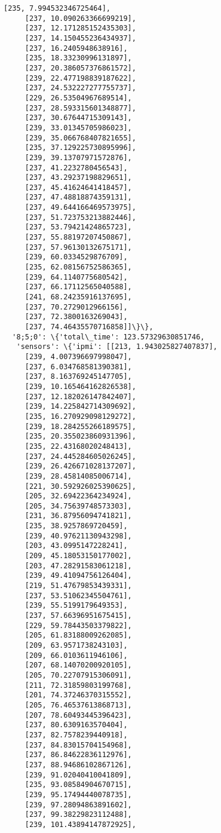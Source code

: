 \documentclass[11pt]{article}
\begin{document}
\begin{tcolorbox}[breakable, size=fbox, boxrule=.5pt, pad at break*=1mm, opacityfill=0]
\begin{Verbatim}[commandchars=\\\{\}]
     [235, 7.994532346725464],
     [237, 10.090263366699219],
     [237, 12.171285152435303],
     [237, 14.150455236434937],
     [237, 16.2405948638916],
     [235, 18.33230996131897],
     [237, 20.386057376861572],
     [239, 22.477198839187622],
     [237, 24.532227277755737],
     [229, 26.53504967689514],
     [237, 28.593315601348877],
     [237, 30.67644715309143],
     [239, 33.01345705986023],
     [239, 35.066768407821655],
     [235, 37.129225730895996],
     [239, 39.13707971572876],
     [237, 41.2232780456543],
     [237, 43.29237198829651],
     [237, 45.41624641418457],
     [237, 47.48818874359131],
     [237, 49.644166469573975],
     [237, 51.723753213882446],
     [237, 53.79421424865723],
     [237, 55.88197207450867],
     [237, 57.96130132675171],
     [239, 60.0334529876709],
     [235, 62.08156752586365],
     [239, 64.1140775680542],
     [237, 66.17112565040588],
     [241, 68.24235916137695],
     [237, 70.2729012966156],
     [237, 72.3800163269043],
     [237, 74.46435570716858]]\}\},
  '8;5;0': \{'total\_time': 123.57329630851746,
   'sensors': \{'ipmi': [[213, 1.943025827407837],
     [239, 4.007396697998047],
     [237, 6.034768581390381],
     [237, 8.163769245147705],
     [239, 10.165464162826538],
     [237, 12.182026147842407],
     [239, 14.225842714309692],
     [235, 16.270929098129272],
     [239, 18.284255266189575],
     [235, 20.355023860931396],
     [235, 22.43168020248413],
     [237, 24.445284605026245],
     [239, 26.426671028137207],
     [239, 28.45814085006714],
     [221, 30.592926025390625],
     [205, 32.69422364234924],
     [205, 34.75639748573303],
     [231, 36.87956094741821],
     [235, 38.9257869720459],
     [239, 40.97621130943298],
     [203, 43.0995147228241],
     [209, 45.18053150177002],
     [203, 47.28291583061218],
     [239, 49.41094756126404],
     [219, 51.47679853439331],
     [237, 53.51062345504761],
     [239, 55.5199179649353],
     [237, 57.66396951675415],
     [229, 59.78443503379822],
     [205, 61.83188009262085],
     [209, 63.9571738243103],
     [209, 66.0103611946106],
     [207, 68.14070200920105],
     [205, 70.22707915306091],
     [211, 72.31859803199768],
     [201, 74.37246370315552],
     [205, 76.46537613868713],
     [207, 78.60493445396423],
     [237, 80.6309163570404],
     [237, 82.7578239440918],
     [237, 84.83015704154968],
     [237, 86.84622836112976],
     [237, 88.94686102867126],
     [239, 91.02040410041809],
     [235, 93.08584904670715],
     [239, 95.17494440078735],
     [239, 97.28094863891602],
     [237, 99.38229823112488],
     [239, 101.43894147872925],

\end{Verbatim}
\end{tcolorbox}
\end{document}
